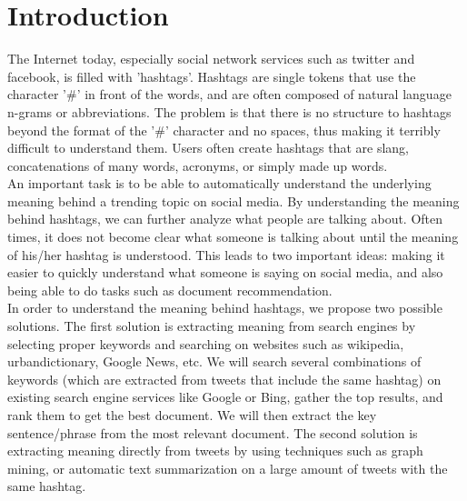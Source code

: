 \documentclass{sig-alternate}
\begin{document}
\section{Introduction}
The Internet today, especially social network services such as twitter and facebook, is filled with 'hashtags'. Hashtags are single tokens that use the character '\#' in front of the words, and are often composed of natural language n-grams or abbreviations. The problem is that there is no structure to hashtags beyond the format of the '\#' character and no spaces, thus making it terribly difficult to understand them. Users often create hashtags that are slang, concatenations of many words, acronyms, or simply made up words.\\
An important task is to be able to automatically understand the underlying meaning behind a trending topic on social media. By understanding the meaning behind hashtags, we can further analyze what people are talking about. Often times, it does not become clear what someone is talking about until the meaning of his/her hashtag is understood. This leads to two important ideas: making it easier to quickly understand what someone is saying on social media, and also being able to do tasks such as document recommendation.\\
In order to understand the meaning behind hashtags, we propose two possible solutions. The first solution is extracting meaning from search engines by selecting proper keywords and searching on websites such as wikipedia, urbandictionary, Google News, etc. We will search several combinations of keywords (which are extracted from tweets that include the same hashtag) on existing search engine services like Google or Bing, gather the top results, and rank them to get the best document. We will then extract the key sentence/phrase from the most relevant document. The second solution is extracting meaning directly from tweets by using techniques such as graph mining, or automatic text summarization on a large amount of tweets with the same hashtag.\\
\end{document}
